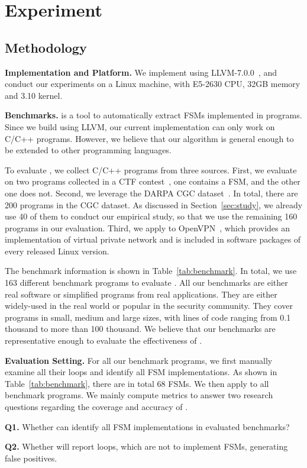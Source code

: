 \section{Experiment}

\subsection{Methodology}

\noindent\textbf{Implementation and Platform.} 
We implement \Tool{} using LLVM-7.0.0~\cite{LLVM}, 
and conduct our experiments on a Linux machine, 
with E5-2630 CPU, 32GB memory and 3.10 kernel. 

\noindent\textbf{Benchmarks.}
\Tool{} is a tool to automatically extract FSMs implemented in programs. 
Since we build \Tool{} using LLVM, 
our current implementation can only work on C/C++ programs.  
However, we believe that our algorithm is general enough 
to be extended to other programming languages. 

To evaluate \Tool{}, we collect C/C++ programs from three sources. 
First, we evaluate \Tool{} on two programs collected in a CTF contest~\cite{ctf}, 
one contains a FSM, and the other one does not. 
Second, we leverage the DARPA CGC dataset~\cite{CGC}. 
In total, there are 200 programs in the CGC dataset.
As discussed in Section~\ref{sec:study}, 
we already use 40 of them to conduct our empirical study,
so that we use the remaining 160 programs in our evaluation.
Third, we apply \Tool{} to OpenVPN~\cite{openvpn}, 
which provides an implementation of virtual private network and 
is included in software packages of every released Linux version. 




The benchmark information is shown in Table~\ref{tab:benchmark}.
In total, we use 163 different benchmark programs to evaluate \Tool{}.
All our benchmarks are either real software or 
simplified programs from real applications. 
They are either widely-used in the real world or popular in the security community. 
They cover programs in small, medium and large sizes, 
with lines of code ranging from 0.1 thousand to more than 100 thousand.  
We believe that our benchmarks are representative 
enough to evaluate the effectiveness of \Tool{}. 

\noindent\textbf{Evaluation Setting.} 
For all our benchmark programs, we first manually examine all their loops and 
identify all FSM implementations. 
As shown in Table~\ref{tab:benchmark}, there are in 
total 68 FSMs. 
We then apply \Tool{} to all benchmark programs. 
We mainly compute metrics to answer two research 
questions regarding the coverage and accuracy of \Tool{}.

\textbf{Q1.} Whether \Tool{} can identify all FSM implementations 
in evaluated benchmarks?
 
\textbf{Q2.} Whether \Tool{} will report loops, which are not to implement FSMs, 
generating false positives. 


